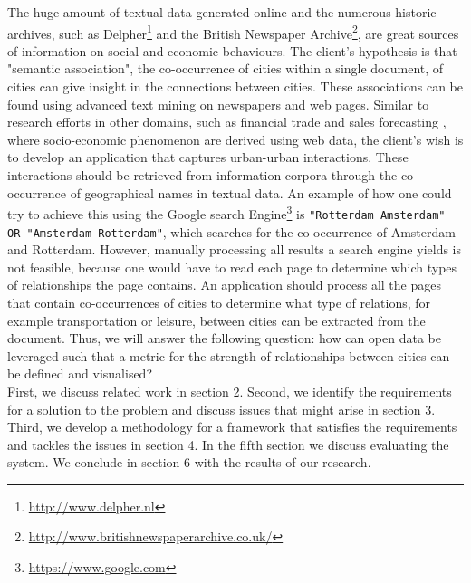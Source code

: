 The huge amount of textual data generated online and the numerous historic archives, such as Delpher\footnote{\url{http://www.delpher.nl}} and the British Newspaper Archive\footnote{\url{http://www.britishnewspaperarchive.co.uk/}}, are great sources of information on social and economic behaviours. The client's hypothesis is that "semantic association", the co-occurrence of cities within a single document, of cities can give insight in the connections between cities. These associations can be found using advanced text mining on newspapers and web pages. Similar to research efforts in other domains, such as financial trade \cite{preis2013quantifying} and sales forecasting \cite{wu2014future}, where socio-economic phenomenon are derived using web data, the client's wish is to develop an application that captures urban-urban interactions. These interactions should be retrieved from information corpora through the co-occurrence of geographical names in textual data. An example of how one could try to achieve this using the Google search Engine\footnote{\url{https://www.google.com}} is \texttt{"Rotterdam Amsterdam" OR "Amsterdam Rotterdam"}, which searches for the co-occurrence of Amsterdam and Rotterdam. However, manually processing all results a search engine yields is not feasible, because one would have to read each page to determine which types of relationships the page contains. An application should process all the pages that contain co-occurrences of cities to determine what type of relations, for example transportation or leisure, between cities can be extracted from the document. Thus, we will answer the following question: 
how can open data be leveraged such that a metric for the strength of relationships between cities can be defined and visualised? \\

First, we discuss related work in section 2. Second, we identify the requirements for a solution to the problem and discuss issues that might arise in section 3. Third, we develop a methodology for a framework that satisfies the requirements and tackles the issues in section 4. In the fifth section we discuss evaluating the system. We conclude in section 6 with the results of our research.
